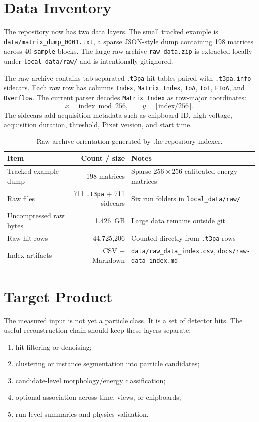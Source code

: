 \documentclass[11pt,a4paper]{article}
\newcommand{\code}[1]{\texttt{#1}}
\begin{document}
\section{Data Inventory}

The repository now has two data layers. The small tracked example is \code{data/matrix\_dump\_0001.txt}, a sparse JSON-style dump containing 198 matrices across 40 \code{sample} blocks. The large raw archive \code{raw\_data.zip} is extracted locally under \code{local\_data/raw/} and is intentionally gitignored.

The raw archive contains tab-separated \code{.t3pa} hit tables paired with \code{.t3pa.info} sidecars. Each raw row has columns \code{Index}, \code{Matrix Index}, \code{ToA}, \code{ToT}, \code{FToA}, and \code{Overflow}. The current parser decodes \code{Matrix Index} as row-major coordinates:
\[
x = \mathrm{index}\bmod 256,\qquad y=\lfloor \mathrm{index}/256 \rfloor.
\]
The sidecars add acquisition metadata such as chipboard ID, high voltage, acquisition duration, threshold, Pixet version, and start time.

\begin{table}[H]
\centering
\caption{Raw archive orientation generated by the repository indexer.}
\label{tab:raw-index}
\begin{tabularx}{\textwidth}{@{}lrl@{}}
\toprule
\textbf{Item} & \textbf{Count / size} & \textbf{Notes} \\
\midrule
Tracked example dump & 198 matrices & Sparse $256\times256$ calibrated-energy matrices \\
Raw files & 711 \code{.t3pa} + 711 sidecars & Six run folders in \code{local\_data/raw/} \\
Uncompressed raw bytes & \SI{1.426}{GB} & Large data remains outside git \\
Raw hit rows & 44,725,206 & Counted directly from \code{.t3pa} rows \\
Index artifacts & CSV + Markdown & \code{data/raw\_data\_index.csv}, \code{docs/raw-data-index.md} \\
\bottomrule
\end{tabularx}
\end{table}

\section{Target Product}

The measured input is not yet a particle class. It is a set of detector hits. The useful reconstruction chain should keep these layers separate:
\begin{enumerate}
    \item hit filtering or denoising;
    \item clustering or instance segmentation into particle candidates;
    \item candidate-level morphology/energy classification;
    \item optional association across time, views, or chipboards;
    \item run-level summaries and physics validation.
\end{enumerate}
\end{document}

